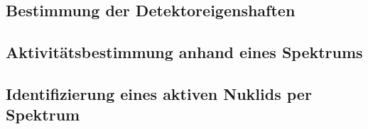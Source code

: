 \subsection{Bestimmung der Detektoreigenshaften}
\label{sec:Detektoreigenschaften}

\subsection{Aktivitätsbestimmung anhand eines Spektrums}
\label{sec:Aktivitätsbestimmung}

\subsection{Identifizierung eines aktiven Nuklids per Spektrum}
\label{sec:Nuklidbestimmung}


